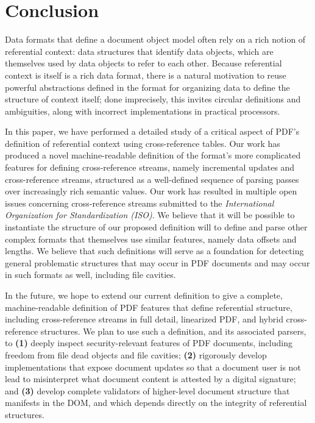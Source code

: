 \section{Conclusion}
\label{sec:conclusion}
Data formats that define a document object model often rely on a rich
notion of referential context: data structures that identify data
objects, which are themselves used by data objects to refer to each
other.
%
Because referential context is itself is a rich data format, there is
a natural motivation to reuse powerful abstractions defined in the
format for organizing data to define the structure of context itself;
%
done imprecisely, this invites circular definitions and ambiguities,
along with incorrect implementations in practical processors.

In this paper, we have performed a detailed study of a critical aspect
of PDF's definition of referential context using cross-reference
tables.
%
Our work has produced a novel machine-readable definition of the
format's more complicated features for defining cross-reference
streams, namely incremental updates and cross-reference streams,
structured as a well-defined sequence of parsing passes over
increasingly rich semantic values.
%
Our work has resulted in multiple open issues concerning
cross-reference streams submitted to the \emph{International
  Organization for Standardization (ISO)}.
%
We believe that it will be possible to instantiate the structure of
our proposed definition will to define and parse other complex formats
that themselves use similar features, namely data offsets and lengths.
%
We believe that such definitions will serve as a foundation for
detecting general problematic structures that may occur in PDF
documents and may occur in such formats as well, including file
cavities.

In the future, we hope to extend our current definition to give a
complete, machine-readable definition of PDF features that define
referential structure, including cross-reference streams in full
detail, linearized PDF, and hybrid cross-reference structures.
%
We plan to use such a definition, and its associated parsers, to
% 
\textbf{(1)} deeply inspect security-relevant features of PDF
documents, including freedom from file dead objects and file cavities;
%
\textbf{(2)} rigorously develop implementations that expose document
updates so that a document user is not lead to misinterpret what
document content is attested by a digital signature; and
% 
\textbf{(3)} develop complete validators of higher-level document
structure that manifests in the DOM, and which depends directly on the
integrity of referential structures.